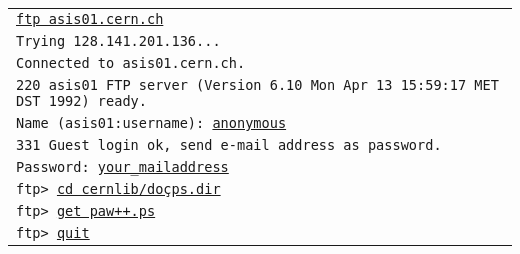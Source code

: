 \vspace*{3mm}
\begin{tabular}{@{\hspace{5mm}}>{\tt}l}
\underline{ftp asis01.cern.ch}\\
Trying 128.141.201.136...\\
Connected to asis01.cern.ch.\\
220 asis01 FTP server (Version 6.10 Mon Apr 13 15:59:17 MET DST 1992) ready.\\
Name (asis01:username): \underline{anonymous}\\
331 Guest login ok, send e-mail address as password.\\
Password: \underline{your\_{}mailaddress}\\
ftp> \underline{cd cernlib/do\c cps.dir}\\
ftp> \underline{get paw++.ps}\\
ftp> \underline{quit}\\
\end{tabular}
 
\newpage
\tableofcontents
\listoffigures
\listoftables
